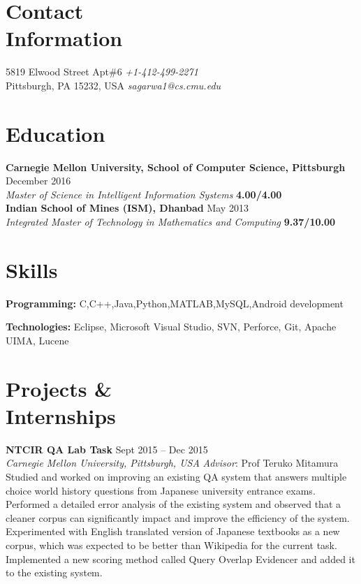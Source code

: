 \documentclass[margin,line]{resume}
\begin{document}
\begin{resume}

\section{\mysidestyle Contact \\Information}
		5819 Elwood Street Apt\#6                       \hfill \textit{+1-412-499-2271} \\
		Pittsburgh, PA 15232, USA                   \hfill \textit{sagarwa1@cs.cmu.edu}

\section{\mysidestyle Education}
		\textbf{Carnegie Mellon University, School of Computer Science, Pittsburgh} \hfill December 2016 \\
		\textit{Master of Science in Intelligent Information Systems} \hfill  \textbf{4.00/4.00} \\
		\textbf{Indian School of Mines (ISM), Dhanbad} \hfill May 2013 \\
		\textit{Integrated Master of Technology in Mathematics and Computing} \hfill \textbf{9.37/10.00}

\section{\mysidestyle Skills}
   		 	\textbf{Programming: }C,C++,Java,Python,MATLAB,MySQL,Android development

			\textbf{Technologies: }Eclipse, Microsoft Visual Studio, SVN, Perforce, Git, Apache UIMA, Lucene

\section{\mysidestyle Projects \& \\Internships}

	    \textbf{NTCIR QA Lab Task} \hfill Sept 2015 -- Dec 2015 \\
  		\textit{Carnegie Mellon University, Pittsburgh, USA} \hfill \textit{Advisor}: Prof Teruko Mitamura\\
		Studied and worked on improving an existing QA system that answers multiple choice world history questions from Japanese university entrance exams. Performed a detailed error analysis of the existing system and observed that a cleaner corpus can significantly impact and improve the efficiency of the system. Experimented with English translated version of Japanese textbooks as a new corpus, which was expected to be better than Wikipedia for the current task. Implemented a new scoring method called Query Overlap Evidencer and added it to the existing system.


\end{resume}
\end{document}
